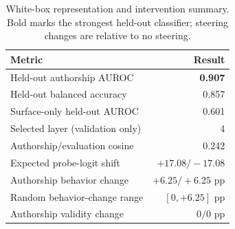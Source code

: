\begin{table}[t]
\centering
\caption{White-box representation and intervention summary. Bold marks the strongest held-out classifier; steering changes are relative to no steering.}
\label{tab:whitebox}
\begin{tabular}{@{}lr@{}}
\toprule
\textbf{Metric} & \textbf{Result} \\
\midrule
Held-out authorship AUROC & {\bf 0.907} \\
Held-out balanced accuracy & 0.857 \\
Surface-only held-out AUROC & 0.601 \\
Selected layer (validation only) & 4 \\
Authorship/evaluation cosine & 0.242 \\
Expected probe-logit shift & $+17.08/-17.08$ \\
Authorship behavior change & $+6.25/+6.25$ pp \\
Random behavior-change range & $[0,+6.25]$ pp \\
Authorship validity change & $0/0$ pp \\
\bottomrule
\end{tabular}
\end{table}

